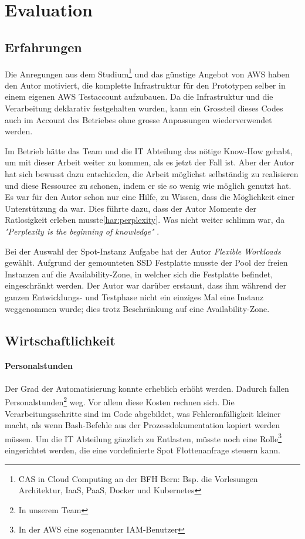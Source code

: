 \section{Evaluation}
\subsection{Erfahrungen}
Die Anregungen aus dem Studium\footnote{CAS in Cloud Computing an der BFH Bern: Bsp. die Vorlesungen Architektur, IaaS, PaaS, Docker und Kubernetes} und das günstige Angebot von AWS haben den Autor motiviert, die komplette Infrastruktur für den Prototypen selber in einem eigenen AWS Testaccount aufzubauen. Da die Infrastruktur und die Verarbeitung deklarativ festgehalten wurden, kann ein Grossteil dieses Codes auch im Account des Betriebes ohne grosse Anpassungen wiederverwendet werden.

Im Betrieb hätte das Team und die IT Abteilung das nötige Know-How gehabt, um mit dieser Arbeit weiter zu kommen, als es jetzt der Fall ist. Aber der Autor hat sich bewusst dazu entschieden, die Arbeit möglichst selbständig zu realisieren und  diese Ressource zu schonen, indem er sie so wenig wie möglich genutzt hat. Es war für den Autor schon nur eine Hilfe, zu Wissen, dass die Möglichkeit einer Unterstützung da war. Dies führte dazu, dass der Autor Momente der Ratlosigkeit erleben musste\ref{har:perplexity}. Was nicht weiter schlimm war, da \textit{"Perplexity is the beginning of knowledge"} \autocite[33]{CloudNativ:1}.

Bei der Auswahl der Spot-Instanz Aufgabe hat der Autor \emph{Flexible Workloads} gewählt. Aufgrund der gemounteten SSD Festplatte musste der Pool der freien Instanzen auf die Availability-Zone, in welcher sich die Festplatte befindet, eingeschränkt werden. Der Autor war darüber erstaunt, dass ihm während der ganzen Entwicklungs- und Testphase nicht ein einziges Mal eine Instanz weggenommen wurde; dies trotz Beschränkung auf eine Availability-Zone.


\subsection{Wirtschaftlichkeit}
\paragraph{Personalstunden}
Der Grad der Automatisierung konnte erheblich erhöht werden. Dadurch fallen Personalstunden\footnote{In unserem Team} weg. Vor allem diese Kosten rechnen sich. Die Verarbeitungsschritte sind im Code abgebildet, was Fehleranfälligkeit kleiner macht, als wenn Bash-Befehle aus der Prozessdokumentation kopiert werden müssen. Um die IT Abteilung gänzlich zu Entlasten, müsste noch eine Rolle\footnote{In der AWS eine sogenannter IAM-Benutzer} eingerichtet werden, die eine vordefinierte Spot Flottenanfrage steuern kann.

